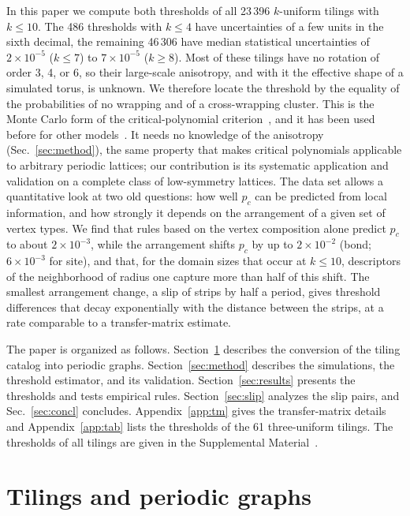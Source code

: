 \documentclass[pre,twocolumn,superscriptaddress,longbibliography,floatfix]{revtex4-2}
\newcommand{\pc}{p_c}
\begin{document}
In this paper we compute both thresholds of all 23\,396 $k$-uniform tilings with $k\le10$. The 486 thresholds with $k\le4$ have uncertainties of a few units in the sixth decimal, the remaining 46\,306 have median statistical uncertainties of $2\times10^{-5}$ ($k\le7$) to $7\times10^{-5}$ ($k\ge8$). Most of these tilings have no rotation of order 3, 4, or 6, so their large-scale anisotropy, and with it the effective shape of a simulated torus, is unknown. We therefore locate the threshold by the equality of the probabilities of no wrapping and of a cross-wrapping cluster. This is the Monte Carlo form of the critical-polynomial criterion~\cite{JacobsenScullard13}, and it has been used before for other models~\cite{Xu21,Bell22}. It needs no knowledge of the anisotropy (Sec.~\ref{sec:method}), the same property that makes critical polynomials applicable to arbitrary periodic lattices; our contribution is its systematic application and validation on a complete class of low-symmetry lattices. The data set allows a quantitative look at two old questions: how well $\pc$ can be predicted from local information, and how strongly it depends on the arrangement of a given set of vertex types. We find that rules based on the vertex composition alone predict $\pc$ to about $2\times10^{-3}$, while the arrangement shifts $\pc$ by up to $2\times10^{-2}$ (bond; $6\times10^{-3}$ for site), and that, for the domain sizes that occur at $k\le10$, descriptors of the neighborhood of radius one capture more than half of this shift. The smallest arrangement change, a slip of strips by half a period, gives threshold differences that decay exponentially with the distance between the strips, at a rate comparable to a transfer-matrix estimate.

The paper is organized as follows. Section~\ref{sec:tilings} describes the conversion of the tiling catalog into periodic graphs. Section~\ref{sec:method} describes the simulations, the threshold estimator, and its validation. Section~\ref{sec:results} presents the thresholds and tests empirical rules. Section~\ref{sec:slip} analyzes the slip pairs, and Sec.~\ref{sec:concl} concludes. Appendix~\ref{app:tm} gives the transfer-matrix details and Appendix~\ref{app:tab} lists the thresholds of the 61 three-uniform tilings. The thresholds of all tilings are given in the Supplemental Material~\cite{SM}.

\section{Tilings and periodic graphs}\label{sec:tilings}
\end{document}
